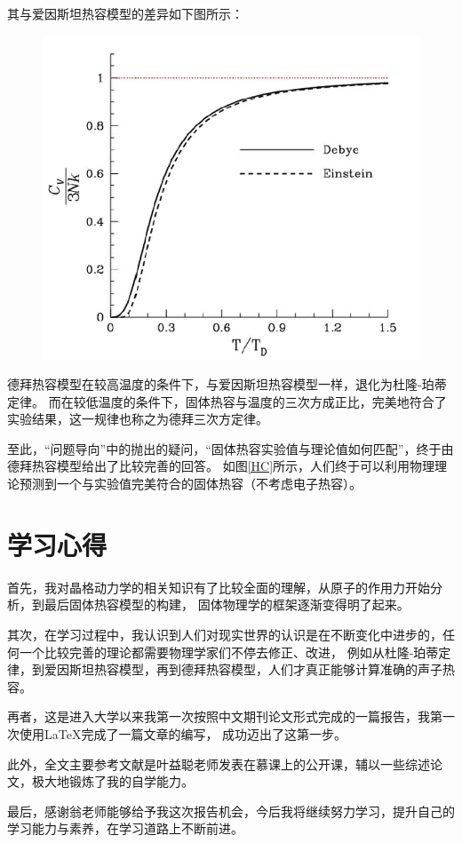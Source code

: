 \documentclass[declarePage]{ecnuthesis}
\begin{document}
其与爱因斯坦热容模型的差异如下图所示：
\begin{figure}[htb]
    \centering
    \includegraphics[width=.46\textwidth]{DE.png}
\end{figure}

德拜热容模型在较高温度的条件下，与爱因斯坦热容模型一样，退化为杜隆-珀蒂定律。%
而在较低温度的条件下，固体热容与温度的三次方成正比，完美地符合了实验结果，这一规律也称之为德拜三次方定律。

至此，“问题导向”中的抛出的疑问，“固体热容实验值与理论值如何匹配”，终于由德拜热容模型给出了比较完善的回答。
如图\ref{HC}所示，人们终于可以利用物理理论预测到一个与实验值完美符合的固体热容（不考虑电子热容）。

\chapter{学习心得}

首先，我对晶格动力学的相关知识有了比较全面的理解，从原子的作用力开始分析，到最后固体热容模型的构建，%
固体物理学的框架逐渐变得明了起来。

其次，在学习过程中，我认识到人们对现实世界的认识是在不断变化中进步的，任何一个比较完善的理论都需要物理学家们不停去修正、改进，%
例如从杜隆-珀蒂定律，到爱因斯坦热容模型，再到德拜热容模型，人们才真正能够计算准确的声子热容。

再者，这是进入大学以来我第一次按照中文期刊论文形式完成的一篇报告，我第一次使用\LaTeX 完成了一篇文章的编写，%
成功迈出了这第一步。

此外，全文主要参考文献是叶益聪老师发表在慕课上的公开课，辅以一些综述论文，极大地锻炼了我的自学能力。

最后，感谢翁老师能够给予我这次报告机会，今后我将继续努力学习，提升自己的学习能力与素养，在学习道路上不断前进。%

\backmatter

\PrintReference

\end{document}
